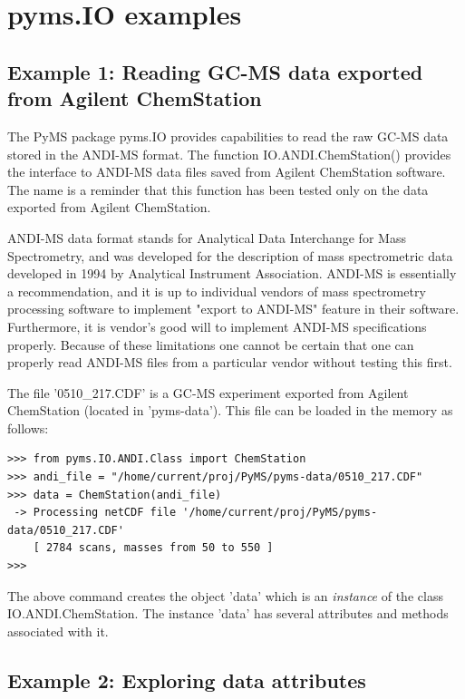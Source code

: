 \section{pyms.IO examples}

\subsection{Example 1: Reading GC-MS data exported from Agilent ChemStation}

The PyMS package pyms.IO provides capabilities to read the raw GC-MS
data stored in the ANDI-MS format. The function IO.ANDI.ChemStation()
provides the interface to ANDI-MS data files saved from Agilent
ChemStation software. The name is a reminder that this function has
been tested only on the data exported from Agilent ChemStation.

ANDI-MS data format stands for Analytical Data Interchange for Mass
Spectrometry, and was developed for the description of mass spectrometric
data developed in 1994 by Analytical Instrument Association. ANDI-MS 
is essentially a recommendation, and it is up to individual vendors of
mass spectrometry processing software to implement "export to ANDI-MS"
feature in their software. Furthermore, it is vendor's good will to
implement ANDI-MS specifications properly. Because of these limitations
one cannot be certain that one can properly read ANDI-MS files from
a particular vendor without testing this first.

The file '0510\_217.CDF' is a GC-MS experiment exported from Agilent
ChemStation (located in 'pyms-data'). This file can be loaded in the
memory as follows:

\begin{verbatim}
>>> from pyms.IO.ANDI.Class import ChemStation
>>> andi_file = "/home/current/proj/PyMS/pyms-data/0510_217.CDF"
>>> data = ChemStation(andi_file)
 -> Processing netCDF file '/home/current/proj/PyMS/pyms-data/0510_217.CDF'
    [ 2784 scans, masses from 50 to 550 ]
>>>
\end{verbatim}

\noindent
The above command creates the object 'data' which is an {\em instance}
of the class IO.ANDI.ChemStation.  The instance 'data' has several
attributes and methods associated with it.

\subsection{Example 2: Exploring data attributes}

